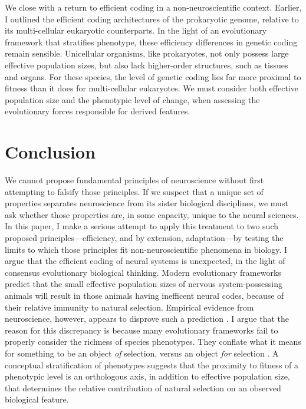 \documentclass{article}
\begin{document}
We close with a return to efficient coding in a non-neuroscientific context. Earlier, I outlined the efficient coding architectures of the prokaryotic genome, relative to its multi-cellular eukaryotic counterparts. In the light of an evolutionary framework that stratifies phenotype, these efficiency differences in genetic coding remain sensible. Unicellular organisms, like prokaryotes, not only possess large effective population sizes, but also lack higher-order structures, such as tissues and organs. For these species, the level of genetic coding lies far more proximal to fitness than it does for multi-cellular eukaryotes. We must consider both effective population size and the phenotypic level of change, when assessing the evolutionary forces responsible for derived features. 


\section{Conclusion}
We cannot propose fundamental principles of neuroscience without first attempting to falsify those principles. If we suspect that a unique set of properties separates neuroscience from its sister biological disciplines, we must ask whether those properties are, in some capacity, unique to the neural sciences. In this paper, I make a serious attempt to apply this treatment to two such proposed principles---efficiency, and by extension, adaptation---by testing the limits to which those principles fit non-neuroscientific phenomena in biology. I argue that the efficient coding of neural systems is unexpected, in the light of consensus evolutionary biological thinking. Modern evolutionary frameworks predict that the small effective population sizes of nervous system-possessing animals will result in those animals having inefficent neural codes, because of their relative immunity to natural selection. Empirical evidence from neuroscience, however, appears to disprove such a prediction \cite{smith_lewicki_2006, olshausen_field_1996, Machens_Gollisch_Kolesnikova_Herz_2005, Pitkow_Meister_2012, barlow_1952, fairhall_deRuyterVan_2001}. I argue that the reason for this discrepancy is because many evolutionary frameworks fail to properly consider the richness of species phenotypes. They conflate what it means for something to be an object \textit{of} selection, versus an object \textit{for} selection \cite{sober1993nature, mayr_1997}. A conceptual stratification of phenotypes suggests that the proximity to fitness of a phenotypic level is an orthologous axis, in addition to effective population size, that determines the relative contribution of natural selection on an observed biological feature. 
\end{document}
